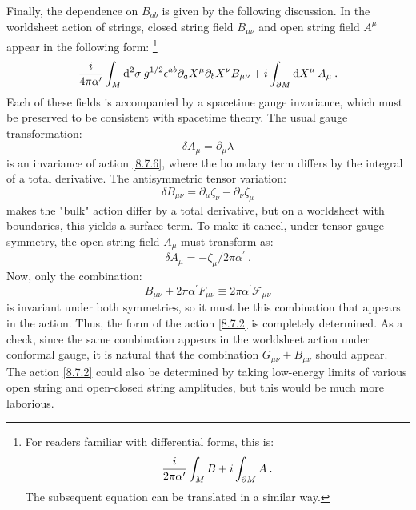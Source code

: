 Finally, the dependence on $B_{ab}$ is given by the following discussion. 
In the worldsheet action of strings, closed string field $B_{\mu \nu}$ and open string field $A^{\mu}$ appear in the following form:
\footnote{For readers familiar with differential forms, this is:
	\[ \frac{i}{2 \pi \alpha^{\prime}} \int_{M} B + i \int_{\partial M} A \:. \]
	The subsequent equation can be translated in a similar way.}
\begin{equation}
	\frac{i}{4 \pi \alpha^{\prime}} \int_{M} \mathrm{d}^{2} \sigma \: g^{1/2} \epsilon^{ab} \partial_{a} X^{\mu} \partial_{b} X^{\nu} 
	B_{\mu\nu} + i \int_{\partial M} \mathrm{d} X^{\mu} \:A_{\mu} \:. \label{8.7.6}
\end{equation}
Each of these fields is accompanied by a spacetime gauge invariance, which must be preserved to be consistent with spacetime theory. The usual gauge transformation:
\begin{equation}
	\delta A_{\mu}=\partial_{\mu} \lambda \label{8.7.7}
\end{equation}
is an invariance of action \eqref{8.7.6}, where the boundary term differs by the integral of a total derivative. The antisymmetric tensor variation:
\begin{equation}
	\delta B_{\mu \nu} = \partial_{\mu} \zeta_{\nu} - \partial_{\nu} \zeta_{\mu} \label{8.7.8}
\end{equation}
makes the "bulk" action differ by a total derivative, but on a worldsheet with boundaries, this yields a surface term. 
To make it cancel, under tensor gauge symmetry, the open string field $A_{\mu}$ must transform as:
\begin{equation}
	\delta A_{\mu}=-\zeta_{\mu} / 2 \pi \alpha^{\prime} \:. \label{8.7.9}
\end{equation}
Now, only the combination:
\begin{equation}
	B_{\mu \nu}+2 \pi \alpha^{\prime} F_{\mu \nu} \equiv 2 \pi \alpha^{\prime} \mathscr{F}_{\mu \nu}  \label{8.7.10}
\end{equation}
is invariant under both symmetries, so it must be this combination that appears in the action. Thus, the form of the action \eqref{8.7.2} is completely determined. 
As a check, since the same combination appears in the worldsheet action under conformal gauge, it is natural that the combination $G_{\mu \nu}+B_{\mu \nu}$ should appear. 
The action \eqref{8.7.2} could also be determined by taking low-energy limits of various open string and open-closed string amplitudes, but this would be much more laborious.


